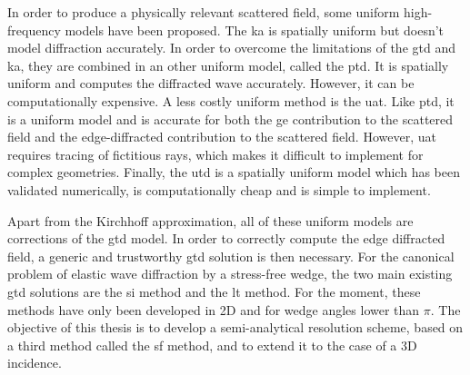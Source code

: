 In order to produce a physically relevant scattered field, some uniform high-frequency models have been proposed. The \acrfull{ka} is spatially uniform but doesn't model diffraction accurately. In order to overcome the limitations of the \acrshort{gtd} and \acrshort{ka}, they are combined in an other uniform model, called the \acrfull{ptd}. It is spatially uniform and computes the diffracted wave accurately. However, it can be computationally expensive. A less costly uniform method is the \acrfull{uat}. Like \acrshort{ptd}, it is a uniform model and is accurate for both the \acrshort{ge} contribution to the scattered field and the edge-diffracted contribution to the scattered field. However, \acrshort{uat} requires tracing of fictitious rays, which makes it difficult to implement for complex geometries. Finally, the \acrfull{utd} is a spatially uniform model which has been validated numerically, is computationally cheap and is simple to implement.

Apart from the Kirchhoff approximation, all of these uniform models are corrections of the \acrshort{gtd} model. In order to correctly compute the edge diffracted field, a generic and trustworthy \acrshort{gtd} solution is then necessary. For the canonical problem of elastic wave diffraction by a stress-free wedge, the two main existing \acrshort{gtd} solutions are the \acrfull{si} method and the \acrfull{lt} method. For the moment, these methods have only been developed in 2D and for wedge angles lower than $\pi$. The objective of this thesis is to develop a semi-analytical resolution scheme, based on a third method called the \acrfull{sf} method, and to extend it to the case of a 3D incidence.